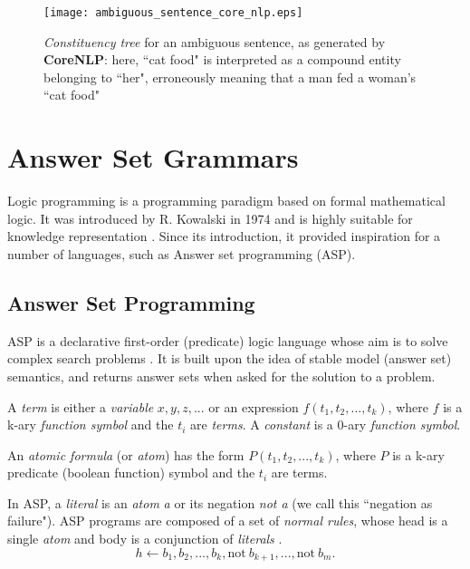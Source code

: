 \begin{figure}[H]
\centering
\texttt{[image: ambiguous\_sentence\_core\_nlp.eps]}
\caption{\textit{Constituency tree} for an ambiguous sentence, as generated by  \textbf{CoreNLP}: here, ``cat food" is interpreted as a compound entity belonging to ``her", erroneously meaning that a man fed a woman's ``cat food"}
\label{fig:dependency_tree_ambiguous_sentence}
\end{figure}

\section{Answer Set Grammars}
\label{sec:asg}


Logic programming is a programming paradigm based on formal mathematical logic. It was introduced by R. Kowalski in 1974 and is highly suitable for knowledge representation \cite{apt_logic_1990}. Since its introduction, it provided inspiration for a number of languages, such as Answer set programming (ASP).

\subsection{Answer Set Programming}

ASP is a declarative first-order (predicate) logic language whose aim is to solve complex search problems \cite{lifschitz_what_nodate}. It is built upon the idea of stable model (answer set) semantics, and returns answer sets when asked for the solution to a problem.

\begin{definition}
A \textit{term} is either a \textit{variable} $x,y,z,...$ or an expression $f(t_1,t_2,...,t_k)$, where $f$ is a k-ary \textit{function symbol} and the $t_i$ are \textit{terms}. A \textit{constant} is a 0-ary \textit{function symbol}.
\end{definition}

\begin{definition}
An \textit{atomic formula} (or \textit{atom}) has the form $P(t_1,t_2,...,t_k)$, where $P$ is a k-ary predicate (boolean function) symbol and the $t_i$ are terms.
\end{definition}

In ASP, a \textit{literal} is an \textit{atom} \textit{a} or its negation \textit{not a} (we call this ``negation as failure"). ASP programs are composed of a set of \textit{normal rules}, whose head is a single \textit{atom} and body is a conjunction of \textit{literals} \cite{law_representing_2019}.
\begin{equation}
h \leftarrow b_1, b_2, ..., b_k, \text{not}\ b_{k+1}, ..., \text{not}\ b_m.
\end{equation}

